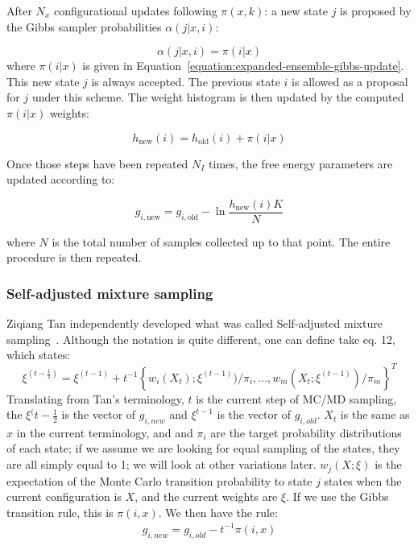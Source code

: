 \documentclass[superscriptaddress,showkeys, nofootinbib, pre, aps]{revtex4-1}
\begin{document}
After $N_x$ configurational updates following $\pi(x,k)$: a new state $j$ is proposed by the Gibbs sampler probabilities $\alpha(j|x, i)$:

\begin{equation}\label{eq:gibbsproposal}
  \alpha(j|x, i) = \pi(i|x)
\end{equation}
where $\pi(i|x)$ is given in Equation~\ref{equation:expanded-ensemble-gibbs-update}.  This new state $j$ is always accepted.  The previous state $i$ is allowed as a proposal for $j$ under this scheme.  The weight histogram is then updated by the computed $\pi(i|x)$ weights:

\begin{equation}
h_{\mathrm{new}}(i) = h_{\mathrm{old}}(i) + \pi(i|x)
\label{eq:awh-weight-histogram}
\end{equation}

Once those steps have been repeated $N_I$ times, the free energy parameters are updated according to:

\begin{equation}
g_{i,\mathrm{new}} = g_{i,\mathrm{old}} - \ln{\frac{h_{\mathrm{new}}(i)K}{N}}
\label{eq:awh_free_energy_up}
\end{equation}

where $N$ is the total number of samples collected up to that point.  The entire procedure is then repeated.
\subsubsection{Self-adjusted mixture sampling}
Ziqiang Tan independently developed what was called Self-adjusted mixture sampling~\cite{SAMS:2014}.  Although the notation is quite different, one can define take eq. 12, which states:
\begin{equation}
\xi^{(t-\frac{1}{2})} = \xi^{(t-1)} + t^{-1}\left\{w_i(X_t);\xi^{(t-1)})/\pi_i,...,w_m(X_t;\xi^{(t-1)})/\pi_m\right\}^T
\end{equation}
Translating from Tan's
terminology, $t$ is the current step of MC/MD sampling, the $\xi^(t-\frac{1}{2}$ is the vector of $g_{i,new}$ and $\xi^{t-1}$ is the vector of $g_{i,old}$. $X_t$ is the same as $x$ in the current terminology, and and $\pi_i$ are the target probability distributions of each state; if we assume we are looking for equal sampling of the states, they are all simply equal to 1; we will look at other variations later. $w_j(X;\xi)$ is the expectation of the Monte Carlo transition probability to state $j$ states when the current configuration is $X$, and the current weights are $\xi$. If we use the Gibbs transition rule, this is $\pi(i,x)$. We then have the rule:
\begin{eqnarray}
g_{i,new} = g_{i,old} - t^{-1}\pi(i,x)
\end{eqnarray}
\end{document}
